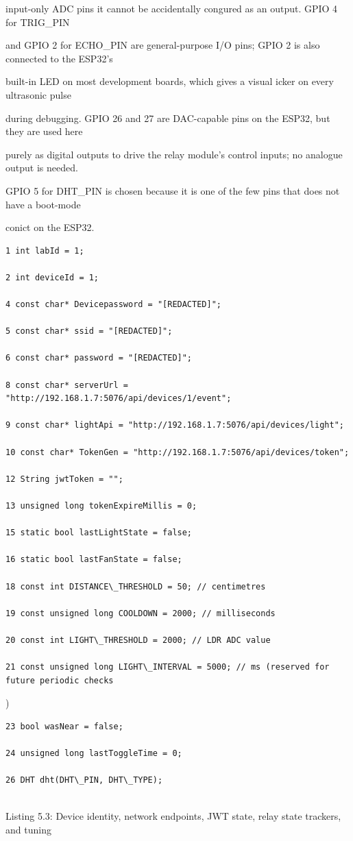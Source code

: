 input-only ADC pins  it cannot be accidentally congured as an output. GPIO 4 for TRIG\_PIN

and GPIO 2 for ECHO\_PIN are general-purpose I/O pins; GPIO 2 is also connected to the ESP32's

built-in LED on most development boards, which gives a visual icker on every ultrasonic pulse

during debugging. GPIO 26 and 27 are DAC-capable pins on the ESP32, but they are used here

purely as digital outputs to drive the relay module's control inputs; no analogue output is needed.

GPIO 5 for DHT\_PIN is chosen because it is one of the few pins that does not have a boot-mode

conict on the ESP32.

\begin{listingbox}
	\begin{verbatim}
1 int labId = 1;

2 int deviceId = 1;

4 const char* Devicepassword = "[REDACTED]";

5 const char* ssid = "[REDACTED]";

6 const char* password = "[REDACTED]";

8 const char* serverUrl = "http://192.168.1.7:5076/api/devices/1/event";

9 const char* lightApi = "http://192.168.1.7:5076/api/devices/light";

10 const char* TokenGen = "http://192.168.1.7:5076/api/devices/token";

12 String jwtToken = "";

13 unsigned long tokenExpireMillis = 0;

15 static bool lastLightState = false;

16 static bool lastFanState = false;

18 const int DISTANCE\_THRESHOLD = 50; // centimetres

19 const unsigned long COOLDOWN = 2000; // milliseconds

20 const int LIGHT\_THRESHOLD = 2000; // LDR ADC value

21 const unsigned long LIGHT\_INTERVAL = 5000; // ms (reserved for future periodic checks

\end{verbatim}
\end{listingbox}
)

\begin{listingbox}
	\begin{verbatim}
23 bool wasNear = false;

24 unsigned long lastToggleTime = 0;

26 DHT dht(DHT\_PIN, DHT\_TYPE);


\end{verbatim}
\end{listingbox}
Listing 5.3: Device identity, network endpoints, JWT state, relay state trackers, and tuning

